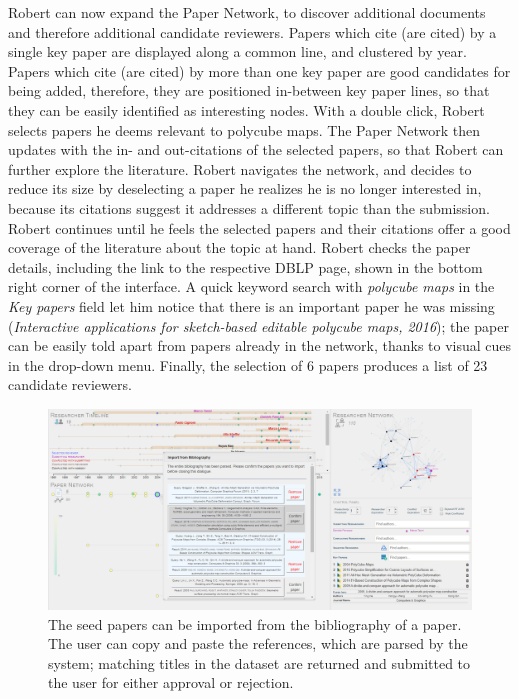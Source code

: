 Robert can now expand the Paper Network, to discover additional documents and therefore additional candidate reviewers. Papers which cite (are cited) by a single key paper are displayed along a common line, and clustered by year. Papers which cite (are cited) by more than one key paper are good candidates for being added, therefore, they are positioned in-between key paper lines, so that they can be easily identified as interesting nodes. With a double click, Robert selects  papers he deems relevant to polycube maps. The Paper Network then updates with the in- and out-citations of the selected papers, so that Robert can further explore the literature. Robert navigates the network, and decides to reduce its size by deselecting a paper he realizes he is no longer interested in, because its citations suggest it addresses a different topic than the submission. %
Robert continues until he feels the selected papers and their citations offer a good coverage of the literature about the topic at hand. Robert checks the paper details, including the link to the respective DBLP page, shown in the bottom right corner of the interface. A quick keyword search with \emph{polycube maps} in the \emph{Key papers} field let him notice that there is an important paper he was missing (\emph{Interactive applications for sketch-based editable polycube maps, 2016}); the paper can be easily told apart from papers already in the network, thanks to visual cues in the drop-down menu. Finally, the selection of 6 papers produces a list of 23 candidate reviewers. 
    
\begin{figure}[!ht]
    \centering
    \includegraphics[width=\textwidth]{fig/insertion_biblio.png}		
    \caption{The seed papers can be imported from the bibliography of a paper. The user can copy and paste the references, which are parsed by the system; matching titles in the dataset are returned and submitted to the user for either approval or rejection.}%
    \label{fig:keypapers_2}
\end{figure}
    


